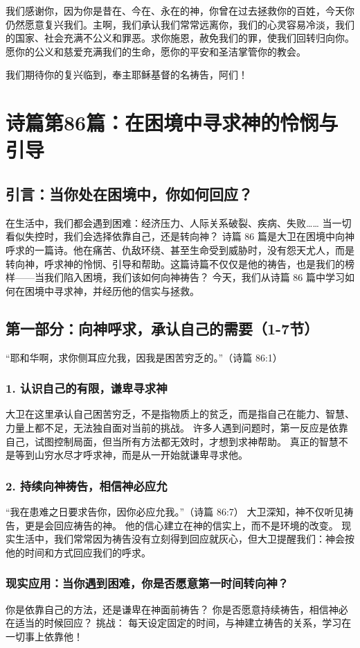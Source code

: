 \documentclass[a4paper, 12pt]{article}
\begin{document}
我们感谢你，因为你是昔在、今在、永在的神，你曾在过去拯救你的百姓，今天你仍然愿意复兴我们。主啊，我们承认我们常常远离你，我们的心灵容易冷淡，我们的国家、社会充满不公义和罪恶。求你施恩，赦免我们的罪，使我们回转归向你。愿你的公义和慈爱充满我们的生命，愿你的平安和圣洁掌管你的教会。

我们期待你的复兴临到，奉主耶稣基督的名祷告，阿们！
\newpage
\section{诗篇第86篇：在困境中寻求神的怜悯与引导}
\subsection*{引言：当你处在困境中，你如何回应？}
在生活中，我们都会遇到困难：经济压力、人际关系破裂、疾病、失败…… 当一切看似失控时，我们会选择依靠自己，还是转向神？
诗篇 86 篇是大卫在困境中向神呼求的一篇诗。他在痛苦、仇敌环绕、甚至生命受到威胁时，没有怨天尤人，而是转向神，呼求神的怜悯、引导和帮助。这篇诗篇不仅仅是他的祷告，也是我们的榜样——当我们陷入困境，我们该如何向神祷告？
今天，我们从诗篇 86 篇中学习如何在困境中寻求神，并经历他的信实与拯救。
\subsection*{第一部分：向神呼求，承认自己的需要（1-7节）}
“耶和华啊，求你侧耳应允我，因我是困苦穷乏的。”（诗篇 86:1）
\subsubsection*{1. 认识自己的有限，谦卑寻求神}
大卫在这里承认自己困苦穷乏，不是指物质上的贫乏，而是指自己在能力、智慧、力量上都不足，无法独自面对当前的挑战。
许多人遇到问题时，第一反应是依靠自己，试图控制局面，但当所有方法都无效时，才想到求神帮助。
真正的智慧不是等到山穷水尽才呼求神，而是从一开始就谦卑寻求他。
\subsubsection*{2. 持续向神祷告，相信神必应允}
“我在患难之日要求告你，因你必应允我。”（诗篇 86:7）
大卫深知，神不仅听见祷告，更是会回应祷告的神。
他的信心建立在神的信实上，而不是环境的改变。
现实生活中，我们常常因为祷告没有立刻得到回应就灰心，但大卫提醒我们：神会按他的时间和方式回应我们的呼求。
\subsubsection*{现实应用：当你遇到困难，你是否愿意第一时间转向神？}
你是依靠自己的方法，还是谦卑在神面前祷告？
你是否愿意持续祷告，相信神必在适当的时候回应？
挑战： 每天设定固定的时间，与神建立祷告的关系，学习在一切事上依靠他！
\end{document}
